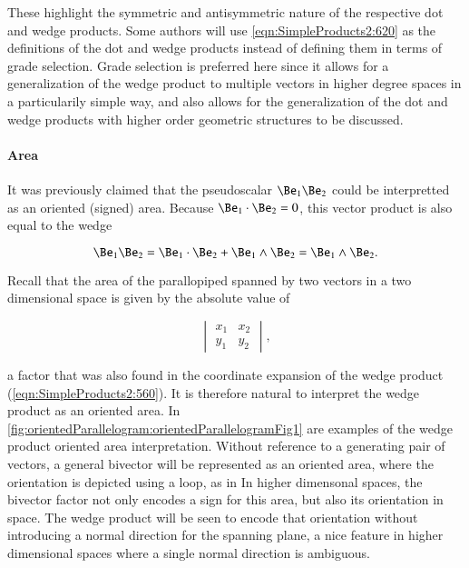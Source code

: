 
These highlight the symmetric and antisymmetric nature of the respective dot and wedge products.  Some authors will use \cref{eqn:SimpleProducts2:620} as the definitions of the dot and wedge products instead of defining them in terms of grade selection.  Grade selection is preferred here since it allows for a generalization of the wedge product to multiple vectors in higher degree spaces in a particularily simple way, and also allows for the generalization of the dot and wedge products with higher order geometric structures to be discussed.

\paragraph{Area}

It was previously claimed that the pseudoscalar \( \Be_1 \Be_2 \) could be interpretted as an oriented (signed) area.  Because \( \Be_1 \cdot \Be_2 = 0 \), this vector product is also equal to the wedge

\begin{dmath}\label{eqn:SimpleProducts2:640}
\Be_1 \Be_2 = \Be_1 \cdot \Be_2 +
\Be_1 \wedge \Be_2
=
\Be_1 \wedge \Be_2.
\end{dmath}

Recall that the area of the parallopiped spanned by two vectors in a two dimensional space is given by the absolute value of

\begin{dmath}\label{eqn:SimpleProducts2:660}
\begin{vmatrix}
   x_1 & x_2 \\
   y_1 & y_2
\end{vmatrix},
\end{dmath}

a factor that was also found in the coordinate expansion of the wedge product (\cref{eqn:SimpleProducts2:560}).  It is therefore natural to interpret the wedge product as an oriented area.  In \cref{fig:orientedParallelogram:orientedParallelogramFig1} are examples of the wedge product oriented area interpretation.
Without reference to a generating pair of vectors, a general bivector will be represented as an oriented area, where the orientation is depicted using a loop, as in
In higher dimensonal spaces, the bivector factor not only encodes a sign for this area, but also its orientation in space.  The wedge product will be seen to encode that orientation without introducing a normal direction for the spanning plane, a nice feature in higher dimensional spaces where a single normal direction is ambiguous.

